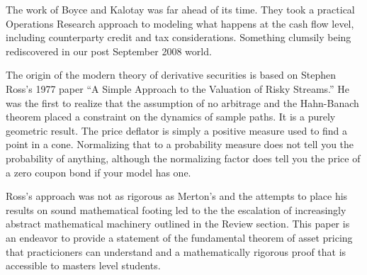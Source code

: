 \documentclass[fleqn]{amsart}
\begin{document}
The work of Boyce and Kalotay \cite{BoyKal1979} was far
ahead of its time. They took a
practical Operations Research approach to modeling what happens
at the cash flow level, including counterparty credit and
tax considerations. Something clumsily being rediscovered in our
post September 2008 world.

The origin of the modern theory of derivative securities is based on
Stephen Ross's 1977 paper ``A Simple Approach to the Valuation of Risky Streams.'' He was the first to realize that the assumption of
no arbitrage and the Hahn-Banach theorem placed a constraint on the
dynamics of sample paths. It is a purely geometric result.
The price deflator is simply a positive measure used to find
a point in a cone. Normalizing that to a probability measure does 
not tell you the probability of anything, although the normalizing
factor does tell you the price of a zero coupon bond if your
model has one.

Ross's approach was not as rigorous as Merton's and
the attempts to place his results on sound mathematical
footing led to the the escalation of increasingly abstract mathematical
machinery outlined in the Review section. This paper
is an endeavor to provide a statement of the fundamental theorem
of asset pricing that practicioners can understand and a mathematically 
rigorous proof that is accessible to masters level students.



{}
\end{document}

